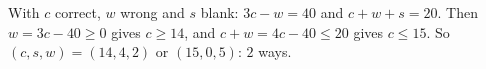 With $c$ correct, $w$ wrong and $s$ blank: $3c-w=40$ and $c+w+s=20$. Then $w=3c-40\ge0$ gives $c\ge14$, and $c+w=4c-40\le20$ gives $c\le15$. So $(c,s,w)=(14,4,2)$ or $(15,0,5)$: $\boxed{2}$ ways.
